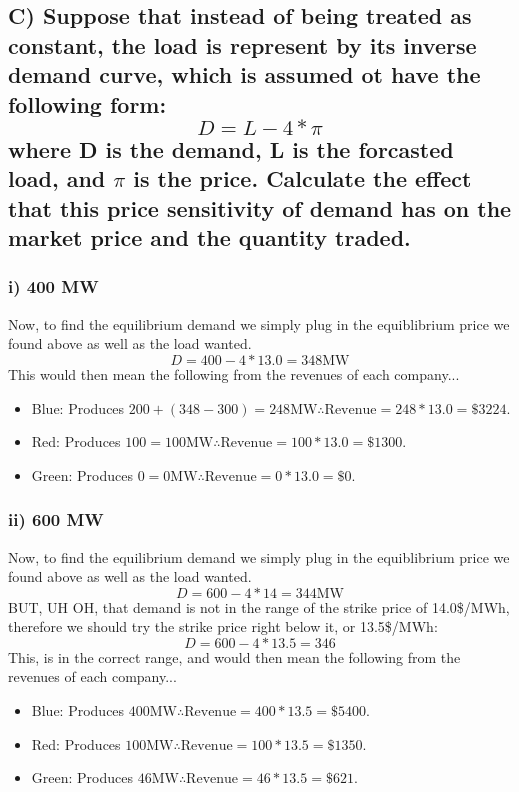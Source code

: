 \documentclass{article}
\begin{document}
\subsection{C) Suppose that instead of being treated as constant, the load is represent by its inverse demand curve, which is assumed ot have the following form: $$ D = L - 4*\pi $$ where D is the demand, L is the forcasted load, and $\pi$ is the price. Calculate the effect that this price sensitivity of demand has on the market price and the quantity traded.}

\subsubsection{i) 400 MW}
Now, to find the equilibrium demand we simply plug in the equiblibrium price we found above as well as the load wanted. 
$$ D = 400 - 4*13.0 = 348\text{MW} $$
This would then mean the following from the revenues of each company...
\begin{itemize}
	\item Blue: Produces $200 + (348 - 300) = 248\text{MW} \therefore \text{Revenue} = 248*13.0=\$3224$.
	\item Red: Produces $100 = 100\text{MW} \therefore \text{Revenue} = 100*13.0=\$1300$.
	\item Green: Produces $0 = 0\text{MW} \therefore \text{Revenue} = 0*13.0=\$0$.
\end{itemize}

\subsubsection{ii) 600 MW}
Now, to find the equilibrium demand we simply plug in the equiblibrium price we found above as well as the load wanted. 
$$ D = 600 - 4*14 = 344\text{MW} $$
BUT, UH OH, that demand is not in the range of the strike price of 14.0\$/MWh, therefore we should try the strike price right below it, or 13.5\$/MWh:
$$ D = 600 - 4*13.5 = 346 $$
This, is in the correct range, and would then mean the following from the revenues of each company...
\begin{itemize}
	\item Blue: Produces $400\text{MW} \therefore \text{Revenue} = 400*13.5=\$5400$.
	\item Red: Produces $100\text{MW} \therefore \text{Revenue} = 100*13.5=\$1350$.
	\item Green: Produces $46\text{MW} \therefore \text{Revenue} = 46*13.5=\$621$.
\end{itemize}
\end{document}
